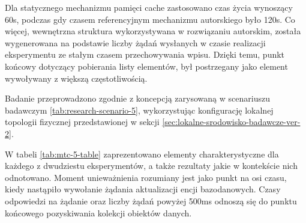 Dla statycznego mechanizmu pamięci cache zastosowano czas życia wynoszący 60s, podczas gdy czasem referencyjnym mechanizmu autorskiego było 120s. Co więcej, wewnętrzna struktura wykorzystywana w rozwiązaniu autorskim, została wygenerowana na podstawie liczby żądań wysłanych w czasie realizacji eksperymentu ze stałym czasem przechowywania wpisu. Dzięki temu, punkt końcowy dotyczący pobierania listy elementów, był postrzegany jako element wywoływany z większą częstotliwością.

Badanie przeprowadzono zgodnie z koncepcją zarysowaną w scenariuszu badawczym \ref{tab:research-scenario-5}, wykorzystując konfigurację lokalnej topologii fizycznej przedstawionej w sekcji \ref{sec:lokalne-srodowisko-badawcze-ver-2}.

W tabeli \ref{tab:mtc-5-table} zaprezentowano elementy charakterystyczne dla każdego z dwudziestu eksperymentów, a także rezultaty jakie w kontekście nich odnotowano. Moment unieważnienia rozumiany jest jako punkt na osi czasu, kiedy nastąpiło wywołanie żądania aktualizacji encji bazodanowych. Czasy odpowiedzi na żądanie oraz liczby żądań powyżej 500ms odnoszą się do punktu końcowego pozyskiwania kolekcji obiektów danych.

